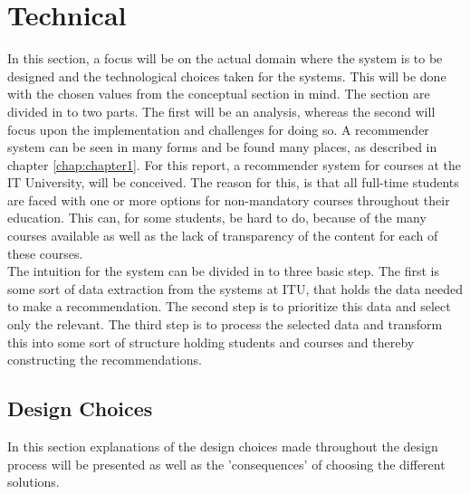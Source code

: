 \section{Technical}


In this section, a focus will be on the actual domain where the system is to be designed and the technological choices taken for the systems. This will be done with the chosen values from the conceptual section in mind. 
The section are divided in to two parts. The first will be an analysis, whereas the second will focus upon the implementation and challenges for doing so. 
A recommender system can be seen in many forms and be found many places, as described in chapter \ref{chap:chapter1}. For this report, a recommender system for courses at the IT University, will be conceived. The reason for this, is that all full-time students are faced with one or more options for non-mandatory courses throughout their education. This can, for some students, be hard to do, because of the many courses available as well as the lack of transparency of the content for each of these courses.\\

The intuition for the system can be divided in to three basic step. The first is some sort of data extraction from the systems at ITU, that holds the data needed to make a recommendation. The second step is to prioritize this data and select only the relevant. The third step is to process the selected data and transform this into some sort of structure holding students and courses and thereby constructing the recommendations.

\subsection{Design Choices}
In this section explanations of the design choices made throughout the design process will be presented as well as the 'consequences' of choosing the different solutions. 

